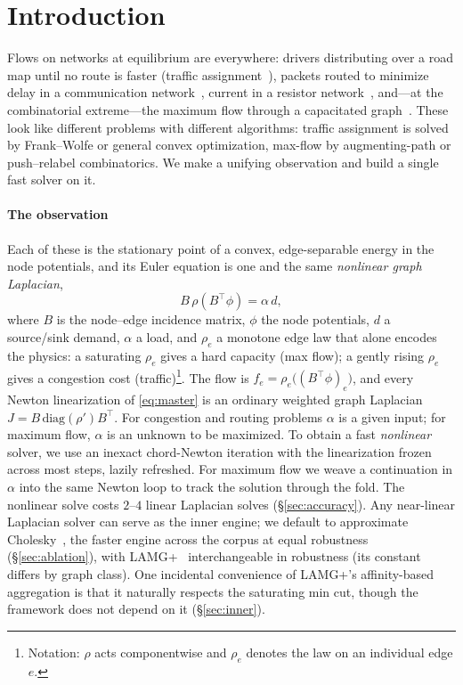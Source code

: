 \documentclass{siamart220329}
\begin{document}
\section{Introduction}\label{sec:intro}
Flows on networks at equilibrium are everywhere: drivers distributing over a road map until no route
is faster (traffic assignment~\cite{beckmann,bpr,boyles-tna}), packets routed to minimize delay in a
communication network~\cite{bertsekas-gallager,mendiola-te}, current in a resistor
network~\cite{doyle-snell}, and---at the combinatorial extreme---the maximum flow through a
capacitated graph~\cite{ahuja-magnanti-orlin,goldberg-tarjan,chen-almost-linear}. These look like different problems with different algorithms: traffic assignment is solved by
Frank--Wolfe or general convex optimization, max-flow by augmenting-path or push--relabel
combinatorics. We make a unifying observation and build a single fast solver on it.

\paragraph{The observation} Each of these is the stationary point of a convex, edge-separable
energy in the node potentials, and its Euler equation is one and the same \emph{nonlinear graph
Laplacian},
\begin{equation}\label{eq:master}
B\,\rho(B^{\top}\phi)=\alpha\,d ,
\end{equation}
where $B$ is the node--edge incidence matrix, $\phi$ the node potentials, $d$ a source/sink demand,
$\alpha$ a load, and $\rho_e$ a monotone edge law that alone encodes the physics: a
saturating $\rho_e$ gives a hard capacity (max flow); a gently rising $\rho_e$ gives a congestion
cost (traffic)\footnote{Notation: $\rho$ acts componentwise and $\rho_e$ denotes the law on an individual edge $e$.}. The flow is $f_e=\rho_e\big((B^{\top}\phi)_e\big)$, and every Newton linearization of
\eqref{eq:master} is an ordinary weighted graph Laplacian $J=B\,\mathrm{diag}(\rho')B^{\top}$. For congestion and routing problems $\alpha$ is a given input; for maximum flow, $\alpha$ is an unknown to be maximized. To obtain a fast \emph{nonlinear} solver, we use an inexact chord-Newton iteration with the linearization frozen across most steps, lazily refreshed. For maximum flow we weave a continuation in $\alpha$ into the same Newton loop to track the solution through the fold. The nonlinear solve costs $2$--$4$ linear Laplacian solves (\S\ref{sec:accuracy}). Any near-linear
Laplacian solver can serve as the inner engine; we default to approximate Cholesky~\cite{approxchol},
the faster engine across the corpus at equal robustness (\S\ref{sec:ablation}), with
LAMG+~\cite{lamgplus} interchangeable in robustness (its constant differs by graph class). One incidental convenience of LAMG+'s
affinity-based aggregation is that it naturally respects the saturating min cut, though the framework
does not depend on it (\S\ref{sec:inner}).
\end{document}
